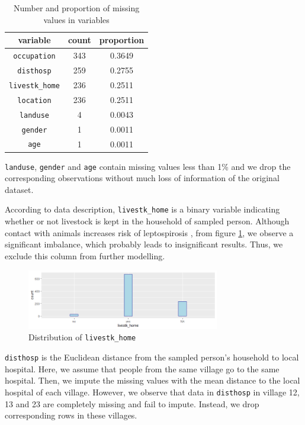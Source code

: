 \documentclass[11pt,twoside]{article}
\numberwithin{Theorem}{section}
\numberwithin{Definition}{section}
\numberwithin{Lemma}{section}
\numberwithin{Algorithm}{section}
\numberwithin{equation}{section}
\begin{document}
\begin{table}[!h]
	\centering
	\begin{tabular}{|c|c|c|}
		\hline
		variable & count & proportion \\
		\hline
		\texttt{occupation} & 343 & 0.3649 \\ 
		\texttt{disthosp} &259 & 0.2755 \\
		\texttt{livestk\_home}  &  236 & 0.2511 \\
        \texttt{location}  &  236 & 0.2511 \\
		\texttt{landuse} & 4 & 0.0043 \\
		\texttt{gender} & 1 & 0.0011 \\
		\texttt{age} & 1 & 0.0011 \\
		\hline
	\end{tabular}
	\caption{Number and proportion of missing values in variables}
	\label{tab:missing}
\end{table}

\texttt{landuse}, \texttt{gender} and \texttt{age} contain missing values less than 1\% and we drop the corresponding observations without much loss of information of the original dataset. 

According to data description, \texttt{livestk\_home} is a binary variable indicating whether or not livestock is kept in the household of sampled person. Although contact with animals increases risk of leptospirosis \cite{cook2017risk}, from figure \ref{fig:livestk}, we observe a significant imbalance, which probably leads to insignificant results. Thus, we exclude this column from further modelling.

\begin{figure}[!h]
	\centering
	\includegraphics[width = 0.75\textwidth]{Images/livestk.png}
	\caption{Distribution of \texttt{livestk\_home}}
	\label{fig:livestk}
\end{figure}

\texttt{disthosp} is the Euclidean distance from the sampled person's household to local hospital. Here, we assume that people from the same village go to the same hospital. Then, we impute the missing values with the mean distance to the local hospital of each village. However, we observe that data in \texttt{disthosp} in village 12, 13 and 23 are completely missing and fail to impute. Instead, we drop corresponding rows in these villages. 
\end{document}
